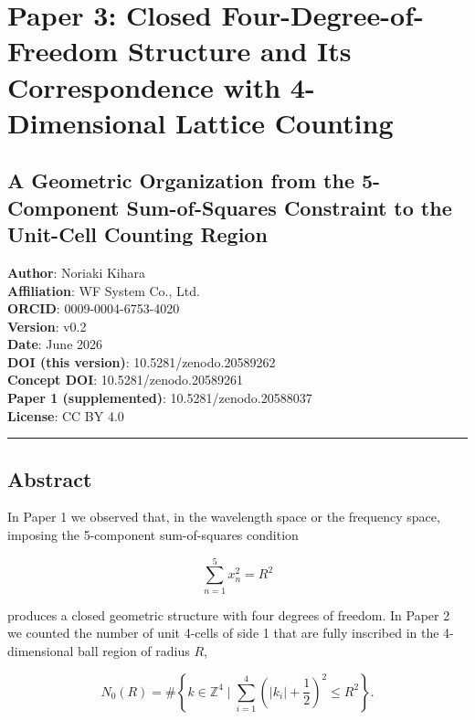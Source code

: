 \documentclass[
]{article}
\author{}
\date{}
\begin{document}
\section{Paper 3: Closed Four-Degree-of-Freedom Structure and Its
Correspondence with 4-Dimensional Lattice
Counting}\label{paper-3-closed-four-degree-of-freedom-structure-and-its-correspondence-with-4-dimensional-lattice-counting}

\subsection{A Geometric Organization from the 5-Component Sum-of-Squares
Constraint to the Unit-Cell Counting
Region}\label{a-geometric-organization-from-the-5-component-sum-of-squares-constraint-to-the-unit-cell-counting-region}

\textbf{Author}: Noriaki Kihara\\
\textbf{Affiliation}: WF System Co., Ltd.\\
\textbf{ORCID}: 0009-0004-6753-4020\\
\textbf{Version}: v0.2\\
\textbf{Date}: June 2026\\
\textbf{DOI (this version)}: 10.5281/zenodo.20589262\\
\textbf{Concept DOI}: 10.5281/zenodo.20589261\\
\textbf{Paper 1 (supplemented)}: 10.5281/zenodo.20588037\\
\textbf{License}: CC BY 4.0

\begin{center}\rule{0.5\linewidth}{0.5pt}\end{center}

\subsection{Abstract}\label{abstract}

In Paper 1 we observed that, in the wavelength space or the frequency
space, imposing the 5-component sum-of-squares condition

\[
\sum_{n=1}^{5}x_n^2=R^2
\]

produces a closed geometric structure with four degrees of freedom. In
Paper 2 we counted the number of unit 4-cells of side 1 that are fully
inscribed in the 4-dimensional ball region of radius \(R\),

\[
N_0(R)
=
\#\left\{
k\in\mathbb{Z}^4
\mid
\sum_{i=1}^{4}
\left(|k_i|+\frac12\right)^2
\le R^2
\right\} .
\]
\end{document}

